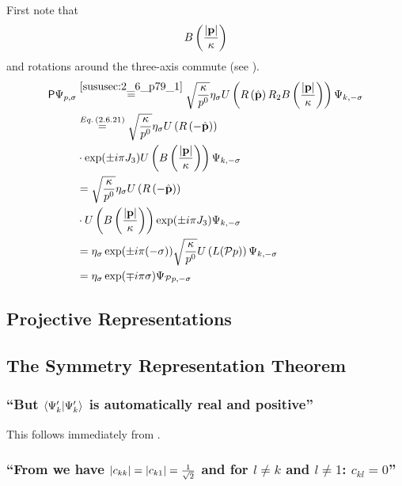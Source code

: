 \subsubsection{ }
First note that \[B\left(\dfrac{\abs{\mathbf{p}}}{\kappa}\right)\] and rotations around the three-axis commute (see ).
\begin{align*} 
	\mathsf{P}\Psi_{p,\sigma}&\overset{\ref{sususec:2_6_p79_1}}{=}\sqrt{\dfrac{\kappa}{p^0}}\eta_\sigma U\left( R\left(\hat{\mathbf{p}}\right)R_2  B\left(\dfrac{\abs{\mathbf{p}}}{\kappa}\right)\right)\Psi_{k,-\sigma}\\
	&\overset{Eq.\,({2.6.21})}{=}\sqrt{\dfrac{\kappa}{p^0}}\eta_\sigma U\left( R\left(-\hat{\mathbf{p}}\right)\right)\\
	&\cdot\exp(\pm i \pi J_3)U\left(  B\left(\dfrac{\abs{\mathbf{p}}}{\kappa}\right)\right)\Psi_{k,-\sigma}\\
	&=\sqrt{\dfrac{\kappa}{p^0}}\eta_\sigma U\left( R\left(-\hat{\mathbf{p}}\right)\right)\\
	&\cdot U\left(  B\left(\dfrac{\abs{\mathbf{p}}}{\kappa}\right)\right)\exp(\pm i \pi J_3)\Psi_{k,-\sigma}\\
	&=\eta_\sigma \exp(\pm i \pi (-\sigma)) \sqrt{\dfrac{\kappa}{p^0}}U\left(L(\mathcal{\mathcal{P}} p)\right)\Psi_{k,-\sigma}\\
	&=\eta_\sigma \exp(\mp i \pi \sigma) \Psi_{\mathcal{\mathcal{P}} p,-\sigma}
\end{align*}




\subsection{Projective Representations}\label{susec:2_7}

\subsection{The Symmetry Representation Theorem}\label{susec:2_A}

\subsubsection{\enquote{But $\innerproduct{\Psi_k^\prime}{\Psi_k^\prime}$ is automatically \textbf{real and positive}} }
This follows immediately from .

\subsubsection{\enquote{From  we have $\abs{c_{kk}}=\abs{c_{k1}}=\frac{1}{\sqrt{2}}$ and for $l\neq k$ and $l\neq 1$: $c_{kl}=0$} }

